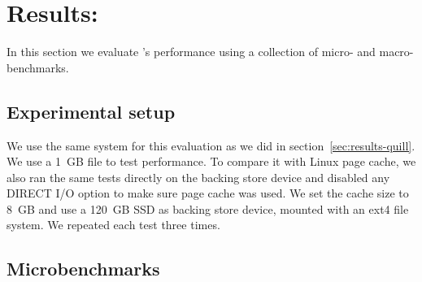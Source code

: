 

\section{Results: \CChell{}}
\label{sec:results-chell}

In this section we evaluate \CChell{}'s performance using a
collection of micro- and macro-benchmarks.  


\subsection{Experimental setup}
\label{sec:setup}

We use the same system for this evaluation as we did in
section~\ref{sec:results-quill}.  We use a 1~GB file to test
\CChell{} performance. To compare it with Linux page cache, we also ran the
same tests directly on the backing store device and disabled any DIRECT I/O
option to make sure page cache was used.  We set the cache size to 8~GB and use
a 120~GB SSD as backing store device, mounted with an ext4 file system.  We
repeated each test three times.

\subsection{Microbenchmarks}
\label{sec:microbenchmark}


